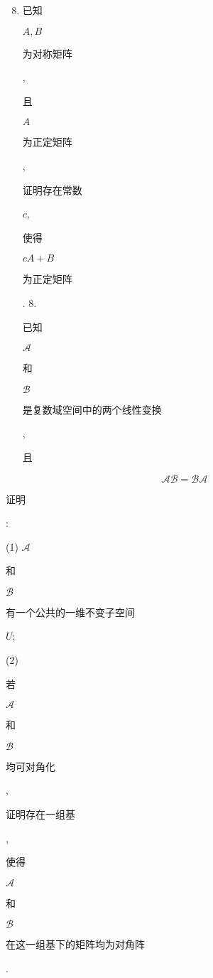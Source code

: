 \documentclass[10pt]{article}
\begin{document}
\begin{enumerate}
  \setcounter{enumi}{7}
  \item \begin{CJK}{UTF8}{mj}已知\end{CJK} $A, B$ \begin{CJK}{UTF8}{mj}为对称矩阵\end{CJK}, \begin{CJK}{UTF8}{mj}且\end{CJK} $A$ \begin{CJK}{UTF8}{mj}为正定矩阵\end{CJK}, \begin{CJK}{UTF8}{mj}证明存在常数\end{CJK} $c$, \begin{CJK}{UTF8}{mj}使得\end{CJK} $c A+B$ \begin{CJK}{UTF8}{mj}为正定矩阵\end{CJK}. 8. \begin{CJK}{UTF8}{mj}已知\end{CJK} $\mathscr{A}$ \begin{CJK}{UTF8}{mj}和\end{CJK} $\mathscr{B}$ \begin{CJK}{UTF8}{mj}是复数域空间中的两个线性变换\end{CJK}, \begin{CJK}{UTF8}{mj}且\end{CJK}
\end{enumerate}
$$
\mathscr{A} \mathscr{B}=\mathscr{B} \mathscr{A}
$$
\begin{CJK}{UTF8}{mj}证明\end{CJK}:

(1) $\mathscr{A}$ \begin{CJK}{UTF8}{mj}和\end{CJK} $\mathscr{B}$ \begin{CJK}{UTF8}{mj}有一个公共的一维不变子空间\end{CJK} $U$;

(2) \begin{CJK}{UTF8}{mj}若\end{CJK} $\mathscr{A}$ \begin{CJK}{UTF8}{mj}和\end{CJK} $\mathscr{B}$ \begin{CJK}{UTF8}{mj}均可对角化\end{CJK}, \begin{CJK}{UTF8}{mj}证明存在一组基\end{CJK}, \begin{CJK}{UTF8}{mj}使得\end{CJK} $\mathscr{A}$ \begin{CJK}{UTF8}{mj}和\end{CJK} $\mathscr{B}$ \begin{CJK}{UTF8}{mj}在这一组基下的矩阵均为对角阵\end{CJK}.
\end{document}
